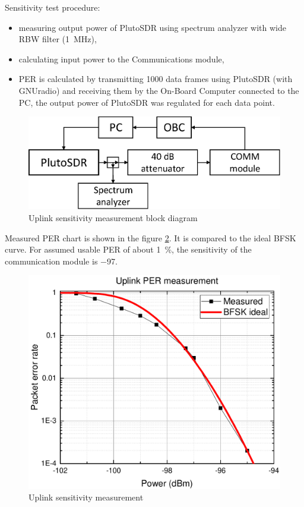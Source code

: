 Sensitivity test procedure:
\begin{itemize}
    \item measuring output power of PlutoSDR using spectrum analyzer with wide RBW filter (\SI{1}{\MHz}),
    \item calculating input power to the Communications module,
    \item PER is calculated by transmitting \si{1000} data frames using PlutoSDR (with GNUradio) and receiving them by the On-Board Computer connected to the PC, the output power of PlutoSDR was regulated for each data point.
\end{itemize}

\begin{figure}[h]
    \centering
    \includegraphics[width=0.6\paperwidth]{img/6/uplink_sensitivity.eps}
    \caption{Uplink sensitivity measurement block diagram}
    \label{4_uplink_sensitivity}
\end{figure}

Measured PER chart is shown in the figure \ref{4_uplink_sensitivity_graph}. It is compared to the ideal BFSK curve. For assumed usable PER of about \SI{1}{\percent}, the sensitivity of the communication module is \SI{-97}{\dBm}.

\begin{figure}[H]
    \centering
    \includegraphics[width=0.8\paperwidth]{img/6/uplink_per.pdf}
    \caption{Uplink sensitivity measurement}
    \label{4_uplink_sensitivity_graph}
\end{figure}


